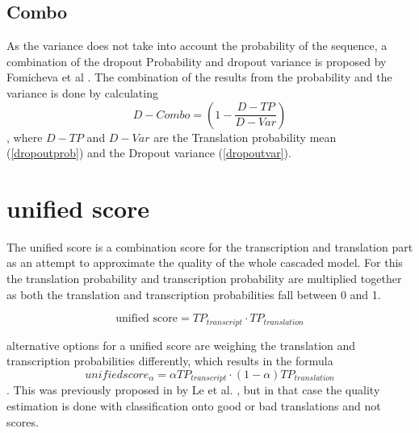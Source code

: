 \subsection{Combo}
As the variance does not take into account the probability of the sequence, a combination of the dropout Probability and dropout variance is proposed by Fomicheva et al \cite{fomicheva2020unsupervised}. 
The combination of the results from the probability and the variance is done by calculating $$D-Combo=(1-\frac{D-TP}{D-Var})\label{formula:Dropoutcombo}$$, where $D-TP$ and $D-Var$ are the Translation probability mean (\autoref{dropoutprob}) and the Dropout variance (\autoref{dropoutvar}).



\section{unified score}
The unified score is a combination score for the transcription and translation part as an attempt to approximate the quality of the whole cascaded model. 
For this the translation probability and transcription probability are multiplied together as both the translation and transcription probabilities fall between 0 and 1. 

$$\text{unified score}= TP_{transcript}\cdot TP_{translation}$$

alternative options for a unified score are weighing the translation and transcription probabilities differently, which results in the formula $$unifiedscore_\alpha= \alpha TP_{transcript} \cdot (1-\alpha)TP_{translation}$$. 
This was previously proposed in by Le et al. \cite{le2016automatic}, but in that case the quality estimation is done with classification onto good or bad translations and not scores.

